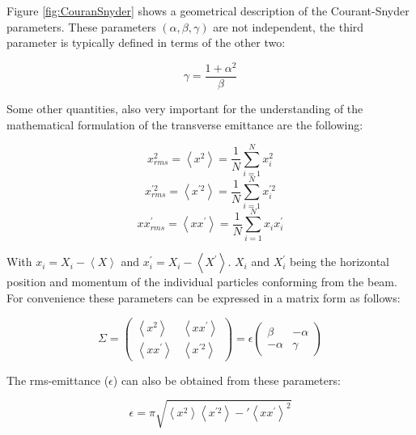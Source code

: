    
Figure \ref{fig:CouranSnyder} shows a geometrical description of the Courant-Snyder parameters. These parameters $\left(\alpha, \beta, \gamma \right)$ are not independent, the third parameter is typically defined in terms of the other two: 

\begin{equation}
    \gamma = \frac{1 + \alpha^{2}}{\beta}
\end{equation}

Some other quantities, also very important for the understanding of the mathematical formulation of the transverse emittance are the following: 

\begin{equation}
    x_{rms}^2 = \left<x^2\right> =\frac{1}{N}\sum_{i=1}^N x_i^2
\end{equation}
\begin{equation}
    x_{rms}^{'2} = \left<x^{'2}\right> = \frac{1}{N}\sum_{i=1}^N x_i^{'2}
\end{equation}
\begin{equation}
    x x^{'}_{rms} =  \left< x x^{'}\right> = \frac{1}{N}\sum_{i = 1}^{N} x_{i} x^{'}_{i}
\end{equation}

With $x_{i} = X_{i} - \left< X \right>$ and $x^{'}_{i} = X_{i} - \left< X^{'}\right>$. $X_{i}$ and $X_{i}^{'}$ being the horizontal position and momentum of the individual particles conforming from the beam. For convenience these parameters can be expressed in a matrix form as follows: 

\begin{equation}
    \Sigma = 
    \begin{pmatrix}
        \left< x^{2} \right> & \left< x x^{'} \right> \\
        \left< x x^{'} \right> & \left< x^{' 2} \right>
    \end{pmatrix}
    = \epsilon 
    \begin{pmatrix}
        \beta & - \alpha \\ -\alpha  & \gamma
    \end{pmatrix}
\end{equation}

The rms-emittance ($\epsilon$) can also be obtained from these parameters: 

\begin{equation}
    \epsilon = \pi \sqrt{\left<x^{2}\right>\left< x^{'2}\right> - '\left<x x^{'}\right>^{2}}
\end{equation}



